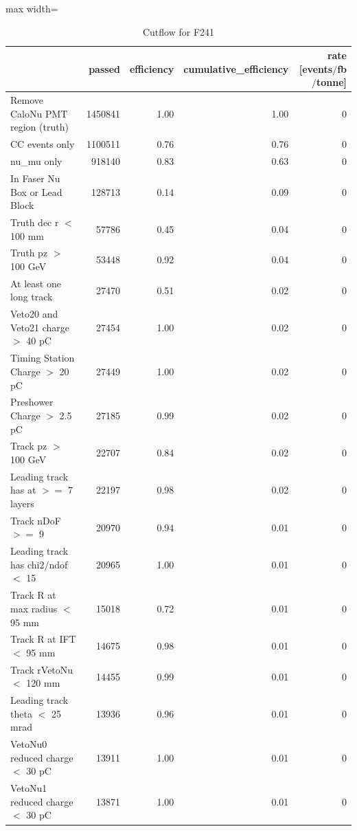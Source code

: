 \documentclass{article}
\begin{document}
\begin{table}
\centering
\caption{Cutflow for F241}
\begin{adjustbox}{max width=\textwidth}
\begin{tabular}{lrrrr}
\toprule
 & passed & efficiency & cumulative\_efficiency & rate [events$/$fb$/$tonne] \\
\midrule
Remove CaloNu PMT region (truth) & 1450841 & 1.00 & 1.00 & 0 \\
CC events only & 1100511 & 0.76 & 0.76 & 0 \\
nu\_mu only & 918140 & 0.83 & 0.63 & 0 \\
In Faser Nu Box or Lead Block & 128713 & 0.14 & 0.09 & 0 \\
Truth dec r $<$ 100 mm & 57786 & 0.45 & 0.04 & 0 \\
Truth pz $>$ 100 GeV & 53448 & 0.92 & 0.04 & 0 \\
At least one long track & 27470 & 0.51 & 0.02 & 0 \\
Veto20 and Veto21 charge $>$ 40 pC & 27454 & 1.00 & 0.02 & 0 \\
Timing Station Charge $>$ 20 pC & 27449 & 1.00 & 0.02 & 0 \\
Preshower Charge $>$ 2.5 pC & 27185 & 0.99 & 0.02 & 0 \\
Track pz $>$ 100 GeV & 22707 & 0.84 & 0.02 & 0 \\
Leading track has at $>$$=$ 7 layers & 22197 & 0.98 & 0.02 & 0 \\
Track nDoF $>$$=$ 9 & 20970 & 0.94 & 0.01 & 0 \\
Leading track has chi2$/$ndof $<$ 15 & 20965 & 1.00 & 0.01 & 0 \\
Track R at max radius $<$ 95 mm & 15018 & 0.72 & 0.01 & 0 \\
Track R at IFT $<$ 95 mm & 14675 & 0.98 & 0.01 & 0 \\
Track rVetoNu $<$ 120 mm & 14455 & 0.99 & 0.01 & 0 \\
Leading track theta $<$ 25 mrad & 13936 & 0.96 & 0.01 & 0 \\
VetoNu0 reduced charge $<$ 30 pC & 13911 & 1.00 & 0.01 & 0 \\
VetoNu1 reduced charge $<$ 30 pC & 13871 & 1.00 & 0.01 & 0 \\
\bottomrule
\end{tabular}

\end{adjustbox}
\end{table}
\end{document}
